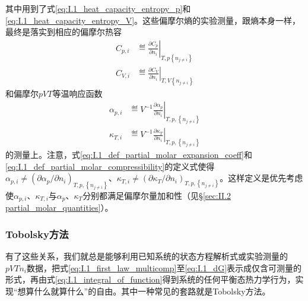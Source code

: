 \documentclass[main.tex]{subfiles}
\begin{document}
其中用到了式\eqref{eq:I.1_heat_capacity_entropy_p}和\eqref{eq:I.1_heat_capacity_entropy_V}。这些偏摩尔熵的实验测量，跟熵本身一样，最终是落实到相应的偏摩尔热容
\begin{align}
  C_{p,i} & \eqdef\left.\frac{\partial C_p}{\partial n_i}\right|_{T,p\left\{n_{j\neq i}\right\}} \label{eq:I.1_def_Cpi} \\
  C_{V,i} & \eqdef\left.\frac{\partial C_V}{\partial n_i}\right|_{T,V\left\{n_{j\neq i}\right\}}\label{eq:I.1_def_CVi}
\end{align}
和偏摩尔$pVT$等温响应函数
\begin{align}
  \alpha_{p,i} & \eqdef V^{-1}\left.\frac{\partial \alpha_p}{\partial n_i}\right|_{T,p,\left\{n_{j\neq i}\right\}}\label{eq:I.1_def_partial_molar_expansion_coeff} \\
  \kappa_{T,i} & \eqdef V^{-1}\left.\frac{\partial \kappa_T}{\partial n_i}\right|_{T,p,\left\{n_{j\neq i}\right\}}\label{eq:I.1_def_partial_molar_compressibility}
\end{align}
的测量上。注意，式\eqref{eq:I.1_def_partial_molar_expansion_coeff}和\eqref{eq:I.1_def_partial_molar_compressibility}的定义式使得$\alpha_{p,i}\neq\left(\partial\alpha_p/\partial n_i\right)_{T,p,\left\{n_{j\neq i}\right\}}$、$\kappa_{T,i}\neq\left(\partial\kappa_T/\partial n_i\right)_{T,p,\left\{n_{j\neq i}\right\}}$。这样定义是优先考虑使$\alpha_{p,i}$、$\kappa_{T,i}$与$\alpha_p$、$\kappa_T$分别都满足偏摩尔量加和性（见\S\ref{sec:II.2 partial_molar_quantities}）。

\subsubsection{Tobolsky方法}
有了这些关系，我们就总是能够利用已知系统的状态方程解析式或实验测量的$pVTn_i$数据，把式\eqref{eq:I.1_first_law_multicomp}至\eqref{eq:I.1_dG}表示成仅含可测量的形式，再由式\eqref{eq:I.1_integral_of_function}得到系统的任何平衡态热力学行为，实现“想算什么就算什么”的自由。其中一种常见的套路就是Tobolsky方法。
\end{document}
